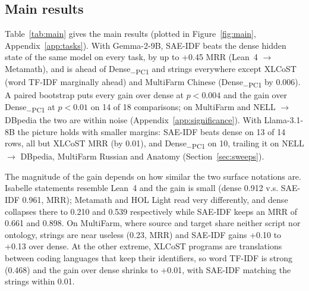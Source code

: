 \documentclass[11pt]{article}
\newcommand{\method}{SAE\mbox{-}IDF\xspace}
\newcommand{\pcone}{Dense\textsubscript{$-$PC1}\xspace}
\begin{document}
\subsection{Main results}
\label{sec:results}

\begin{table}[t]
  \centering\footnotesize
  \setlength{\tabcolsep}{3pt}
  
  \caption{Main results with native context for two model families, each with a 131k-feature SAE (Gemma Scope, Llama Scope). Bold: best per row within each model, Strings counted in both. $\Delta$ dense: \method minus Dense of the same model. $^\dagger$XLCoST official metrics averaged over the seven query languages (per-language results in Appendix~\ref{app:xlcost}); Strings is word TF-IDF there. Valentine has no comparable string baseline. Trained retrievers are compared in Appendix~\ref{app:embed}.}
  \label{tab:main}
\end{table}

Table~\ref{tab:main} gives the main results (plotted in Figure~\ref{fig:main}, Appendix~\ref{app:tasks}).
With Gemma-2-9B, \method beats the dense hidden state of the same model on every task, by up to +0.45 MRR (Lean~4 $\to$ Metamath), and is ahead of \pcone and strings everywhere except XLCoST (word TF-IDF marginally ahead) and MultiFarm Chinese (\pcone by 0.006).
A paired bootstrap puts every gain over dense at $p<0.004$ and the gain over \pcone at $p<0.01$ on 14 of 18 comparisons; on MultiFarm and NELL $\to$ DBpedia the two are within noise (Appendix~\ref{app:significance}).
With Llama-3.1-8B the picture holds with smaller margins: \method beats dense on 13 of 14 rows, all but XLCoST MRR (by 0.01), and \pcone on 10, trailing it on NELL $\to$ DBpedia, MultiFarm Russian and Anatomy (Section~\ref{sec:sweeps}).

The magnitude of the gain depends on how similar the two surface notations are.
Isabelle statements resemble Lean~4 and the gain is small (dense 0.912 v.s. \method 0.961, MRR); Metamath and HOL Light read very differently, and dense collapses there to 0.210 and 0.539 respectively while \method keeps an MRR of 0.661 and 0.898.
On MultiFarm, where source and target share neither script nor ontology, strings are near useless (0.23, MRR) and \method gains +0.10 to +0.13 over dense.
At the other extreme, XLCoST programs are translations between coding languages that keep their identifiers, so word TF-IDF is strong (0.468) and the gain over dense shrinks to +0.01, with \method matching the strings within 0.01.
\end{document}
